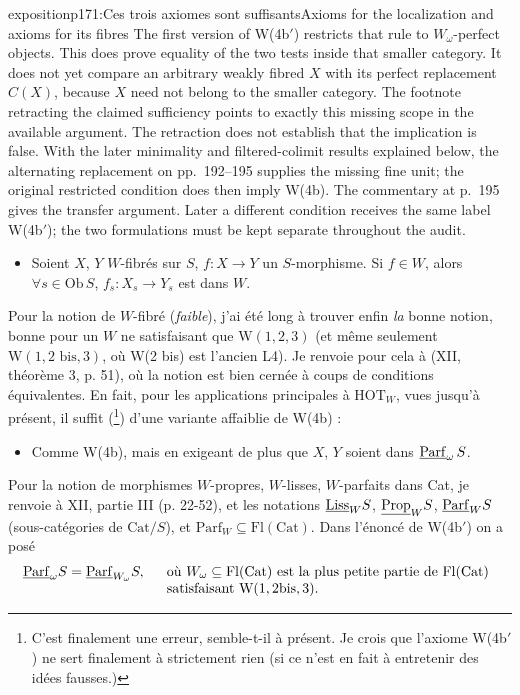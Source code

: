 \begin{dcomment}{exposition}{p171:Ces trois axiomes sont suffisants}{Axioms for the localization and axioms for its fibres}
The first version of W(4b$'$) restricts that rule to $W_\omega$-perfect objects. This does prove equality of the two tests inside that smaller category. It does not yet compare an arbitrary weakly fibred $X$ with its perfect replacement $C(X)$, because $X$ need not belong to the smaller category. The footnote retracting the claimed sufficiency points to exactly this missing scope in the available argument. The retraction does not establish that the implication is false. With the later minimality and filtered-colimit results explained below, the alternating replacement on pp.~192--195 supplies the missing fine unit; the original restricted condition does then imply W(4b). The commentary at p.~195 gives the transfer argument. Later a different condition receives the same label W(4b$'$); the two formulations must be kept separate throughout the audit.
\end{dcomment}


\begin{itemize}[leftmargin=4em]
\item[W(4b)] Soient $X$, $Y$ $W$-fibrés sur $S$, $f : X \longrightarrow Y$ un $S$-morphisme. Si $f \in W$, alors $\forall s \in \mathrm{Ob}\, S$, $f_s : X_s \longrightarrow Y_s$ est dans $W$.
\end{itemize}

Pour la notion de $W$-fibré (\textit{faible}), j'ai été long à trouver enfin \textit{la} bonne notion, bonne pour un $W$ ne satisfaisant que $\mathrm{W}(1,2,3)$ (et même seulement $\mathrm{W}(1, 2 \text{ bis}, 3)$, où W(2 bis) est l'ancien L4). Je renvoie pour cela à (XII, théorème 3, p. 51), où la notion est bien cernée à coups de conditions équivalentes. En fait, pour les applications principales à $\mathrm{HOT}_W$, vues jusqu'à présent, il suffit (\footnote{C'est finalement une erreur, semble-t-il à présent. Je crois que l'axiome W(4b$'$) ne sert finalement à strictement rien (si ce n'est en fait à entretenir des idées fausses.)}) d'une variante affaiblie de W(4b) :

\begin{itemize}[leftmargin=4em]
\item[W(4b$'$)] Comme W(4b), mais en exigeant de plus que $X$, $Y$ soient dans $\underline{\mathrm{Parf}}_\omega\, S$.
\end{itemize}


Pour la notion de morphismes $W$-propres, $W$-lisses, $W$-parfaits dans Cat, je renvoie à XII, partie III (p. 22-52), et les notations $\underline{\mathrm{Liss}}_W S$, $\underline{\mathrm{Prop}}_W S$, $\underline{\mathrm{Parf}}_W S$ (sous-catégories de $\mathrm{Cat}/S$), et $\mathrm{Parf}_W \subseteq \mathrm{Fl}(\mathrm{Cat})$. Dans l'énoncé de W(4b$'$) on a posé
\[
\underline{\mathrm{Parf}}_\omega S = \underline{\mathrm{Parf}}_{W_\omega} S, \quad
\begin{array}[t]{l}
\text{où } W_\omega \subseteq \mathrm{Fl}(\mathrm{Cat}) \text{ est la plus petite partie de } \mathrm{Fl}(\mathrm{Cat})\\
\text{satisfaisant } \mathrm{W}(1, 2\mathrm{bis}, 3).
\end{array}
\]


